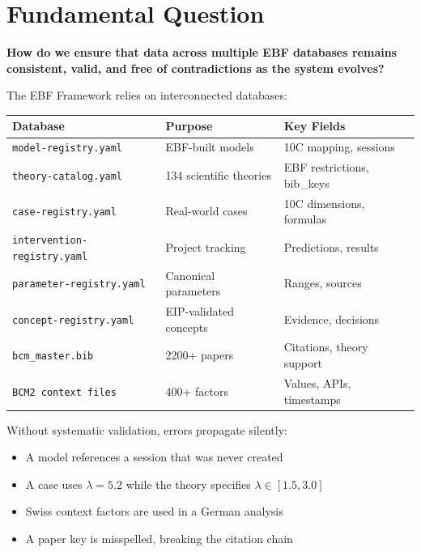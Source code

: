 \section{Fundamental Question}
\label{sec:vc-question}

\begin{tcolorbox}[colback=red!5!white, colframe=red!75!black, title=Central Question]
\textbf{How do we ensure that data across multiple EBF databases remains consistent, valid, and free of contradictions as the system evolves?}
\end{tcolorbox}

The EBF Framework relies on interconnected databases:

\begin{center}
\begin{tabular}{lll}
\toprule
\textbf{Database} & \textbf{Purpose} & \textbf{Key Fields} \\
\midrule
\texttt{model-registry.yaml} & EBF-built models & 10C mapping, sessions \\
\texttt{theory-catalog.yaml} & 134 scientific theories & EBF restrictions, bib\_keys \\
\texttt{case-registry.yaml} & Real-world cases & 10C dimensions, formulas \\
\texttt{intervention-registry.yaml} & Project tracking & Predictions, results \\
\texttt{parameter-registry.yaml} & Canonical parameters & Ranges, sources \\
\texttt{concept-registry.yaml} & EIP-validated concepts & Evidence, decisions \\
\texttt{bcm\_master.bib} & 2200+ papers & Citations, theory support \\
\texttt{BCM2 context files} & 400+ factors & Values, APIs, timestamps \\
\bottomrule
\end{tabular}
\end{center}

Without systematic validation, errors propagate silently:
\begin{itemize}
    \item A model references a session that was never created
    \item A case uses $\lambda = 5.2$ while the theory specifies $\lambda \in [1.5, 3.0]$
    \item Swiss context factors are used in a German analysis
    \item A paper key is misspelled, breaking the citation chain
\end{itemize}

